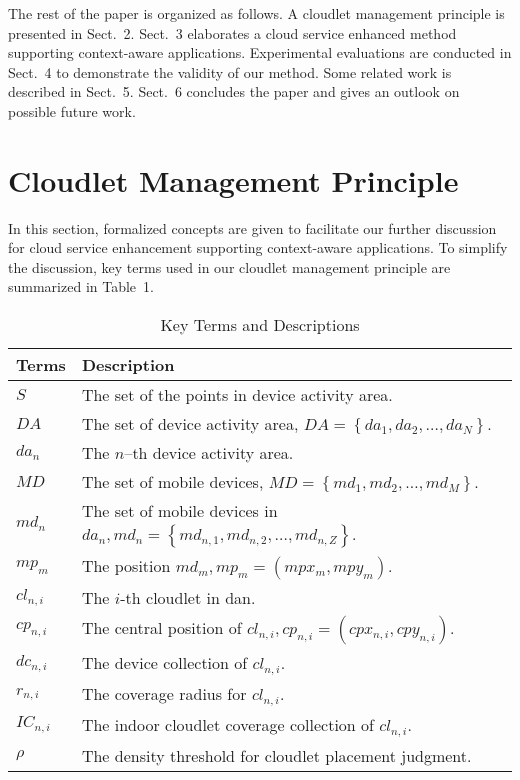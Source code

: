 \documentclass{llncs}
\begin{document}
The rest of the paper is organized as follows. A cloudlet management principle is presented in Sect.~2. Sect.~3 elaborates a cloud service enhanced method supporting context-aware applications. Experimental evaluations are conducted in Sect.~4 to demonstrate the validity of our method. Some related work is described in Sect.~5. Sect.~6 concludes the paper and gives an outlook on possible future work.

%
\section{Cloudlet Management Principle}
%
In this section, formalized concepts are given to facilitate our further discussion for cloud service enhancement supporting context-aware applications. To simplify the discussion, key terms used in our cloudlet management principle are summarized in Table~1.

\begin{table}
\caption{Key Terms and Descriptions}
\begin{center}
\begin{tabular}{l@{\quad}l}
\hline
Terms & Description\\
\hline\rule{0pt}{12pt}
$S$ & The set of the points in device activity area.\\
$DA$ & The set of device activity area, $DA = \left\{da_{1}, da_{2},\dots, da_{N}\right\}$.\\
$da_{n}$ & The $n$--th device activity area.\\
$MD$ & The set of mobile devices, $MD = \left\{md_{1}, md_{2},\dots, md_{M}\right\}$.\\
$md_{n}$ & The set of mobile devices in $da_{n}, md_{n} = \left\{md_{n,1}, md_{n,2},\dots, md_{n,Z}\right\}$.\\
$mp_{m}$ & The position $md_{m}, mp_{m} = \left(mpx_{m}, mpy_{m}\right)$.\\
$cl_{n,i}$ & The $i$-th cloudlet in dan.\\
$cp_{n,i}$ & The central position of $cl_{n,i}, cp_{n,i} = \left(cpx_{n,i}, cpy_{n,i}\right)$.\\
$dc_{n,i}$ & The device collection of $cl_{n,i}$.\\
$r_{n,i}$ & The coverage radius for $cl_{n,i}$.\\
$IC_{n,i}$ & The indoor cloudlet coverage collection of $cl_{n,i}$.\\
$\rho$ & The density threshold for cloudlet placement judgment.\\[2pt]
\hline
\end{tabular}
\end{center}
\end{table}
\end{document}
